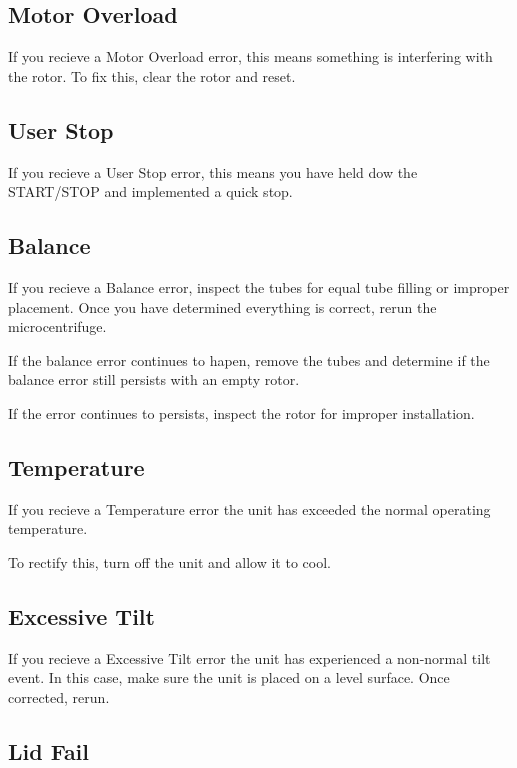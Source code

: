 \documentclass[12pt]{../SOP3_beta}
\begin{document}
\subsection*{Motor Overload}

\NP If you recieve a Motor Overload error, this means something is interfering with the rotor. To fix this, clear the rotor and reset. 

\subsection*{User Stop}

\NP If you recieve a User Stop error, this means you have held dow the START/STOP and implemented a quick stop.

\subsection*{Balance}

\NP If you recieve a Balance error, inspect the tubes for equal tube filling or improper placement. Once you have determined everything is correct, rerun the microcentrifuge. 

\NP If the balance error continues to hapen, remove the tubes and determine if the balance error still persists with an empty rotor.

\NP If the error continues to persists, inspect the rotor for improper installation. 

\subsection*{Temperature}

\NP If you recieve a Temperature error the unit has exceeded the normal operating temperature. 

\NP To rectify this, turn off the unit and allow it to cool. 

\subsection*{Excessive Tilt}

\NP If you recieve a Excessive Tilt error the unit has experienced a non-normal tilt event. In this case, make sure the unit is placed on a level surface. Once corrected, rerun. 

\subsection*{Lid Fail}
\end{document}
